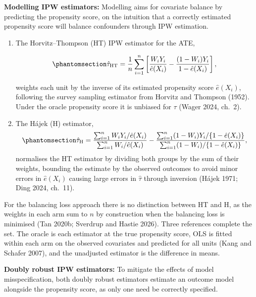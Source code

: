 \documentclass[
  12pt,
  a4paper,
]{article}
\begin{document}
\textbf{Modelling IPW estimators:} Modelling aims for covariate balance
by predicting the propensity score, on the intuition that a correctly
estimated propensity score will balance confounders through IPW
estimation.

\begin{enumerate}
\def\labelenumi{\arabic{enumi}.}
\item
  The Horvitz--Thompson (HT) IPW estimator for the ATE,

  \begin{equation}\protect\phantomsection\label{eq-ht}{\hat\tau_{\mathrm{HT}} = \frac{1}{n}\sum_{i=1}^{n}\left[\frac{W_iY_i}{\hat e(X_i)} - \frac{(1-W_i)Y_i}{1-\hat e(X_i)}\right],}\end{equation}

  weights each unit by the inverse of its estimated propensity score
  \(\hat e(X_i)\), following the survey sampling estimator from Horvitz
  and Thompson (1952). Under the oracle propensity score it is unbiased
  for \(\tau\) (Wager 2024, ch.~2).
\item
  The Hájek (H) estimator,
  \begin{equation}\protect\phantomsection\label{eq-hajek}{\hat\tau_{\mathrm{H}} = \frac{\sum_{i=1}^{n} W_iY_i/\hat e(X_i)}{\sum_{i=1}^{n} W_i/\hat e(X_i)} - \frac{\sum_{i=1}^{n} (1-W_i)Y_i/\{1-\hat e(X_i)\}}{\sum_{i=1}^{n} (1-W_i)/\{1-\hat e(X_i)\}},}\end{equation}
  normalises the HT estimator by dividing both groups by the sum of
  their weights, bounding the estimate by the observed outcomes to avoid
  minor errors in \(\hat e(X_i)\) causing large errors in \(\hat\tau\)
  through inversion (Hájek 1971; Ding 2024, ch.~11).
\end{enumerate}

For the balancing loss approach there is no distinction between HT and
H, as the weights in each arm sum to \(n\) by construction when the
balancing loss is minimised (Tan 2020b; Sverdrup and Hastie 2026). Three
references complete the set. The oracle is each estimator at the true
propensity score, OLS is fitted within each arm on the observed
covariates and predicted for all units (Kang and Schafer 2007), and the
unadjusted estimator is the difference in means.

\textbf{Doubly robust IPW estimators:} To mitigate the effects of model
misspecification, both doubly robust estimators estimate an outcome
model alongside the propensity score, as only one need be correctly
specified.
\end{document}
